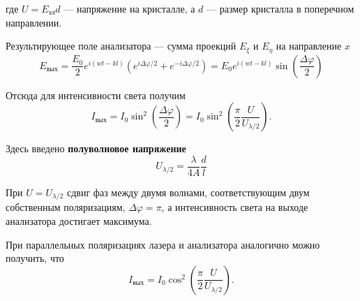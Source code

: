 \documentclass[12pt]{article}
\begin{document}
где $U = E_\text{эл} d$ --- напряжение на кристалле, а $d$ --- размер кристалла в поперечном направлении.
\par
	Результирующее поле анализатора --- сумма проекций $E_\xi$ и $E_\eta$ на направление $x$
\[
	E_\text{вых} = \frac{E_0}{2} e^{i(wt - kl)} \left(e^{i \Delta \varphi / 2} + e^{-i \Delta \varphi / 2} \right) = E_0 e^{i(wt - kl)} \sin\left(\frac{\Delta \varphi}{2} \right)
\]
\newpage
\par
	Отсюда для интенсивности света получим
\begin{equation}
	I_\text{вых} = I_0 \sin^2\left(\frac{\Delta \varphi}{2} \right) = I_0 \sin^2\left(\frac{\pi}{2} \frac{U}{U_\text{$\lambda / 2$}} \right).
\end{equation}
\par
	Здесь введено {\bf полуволновое напряжение}
\begin{equation}
	U_\text{$\lambda / 2$} = \frac{\lambda}{4 A} \frac{d}{l}
\end{equation}
\par
	При $U = U_\text{$\lambda / 2$}$ сдвиг фаз между двумя волнами, соответствующим двум собственным поляризациям, $\Delta \varphi = \pi$, а интенсивность света на выходе анализатора достигает максимума.
\par
	При параллельных поляризациях лазера и анализатора аналогично можно получить, что
\begin{equation}
	I_\text{вых} = I_0 \cos^2\left(\frac{\pi}{2} \frac{U}{U_\text{$\lambda / 2$}} \right).
\end{equation}
\end{document}
